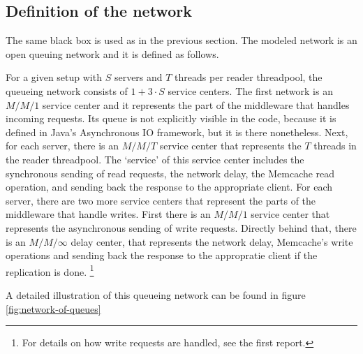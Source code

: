 \documentclass[11pt]{article}
\begin{document}
\subsection{Definition of the network}

The same black box is used as in the previous section.
The modeled network is an open queuing network and it is defined as follows.

For a given setup with $S$ servers and $T$ threads per reader threadpool, the queueing network consists of $1 + 3 \cdot S$ service centers.
The first network is an $M/M/1$ service center and it represents the part of the middleware that handles incoming requests.
Its queue is not explicitly visible in the code, because it is defined in Java's Asynchronous IO framework, but it is there nonetheless.
Next, for each server, there is an $M/M/T$ service center that represents the $T$ threads in the reader threadpool.
The `service' of this service center includes the synchronous sending of read requests, the network delay, the Memcache read operation, and sending back the response to the appropriate client.
For each server, there are two more service centers that represent the parts of the middleware that handle writes.
First there is an $M/M/1$ service center that represents the asynchronous sending of write requests.
Directly behind that, there is an $M/M/\infty$ delay center, that represents the network delay, Memcache's write operations and sending back the response to the appropratie client if the replication is done.
\footnote{For details on how write requests are handled, see the first report.}

A detailed illustration of this queueing network can be found in figure \ref{fig:network-of-queues}
\end{document}
